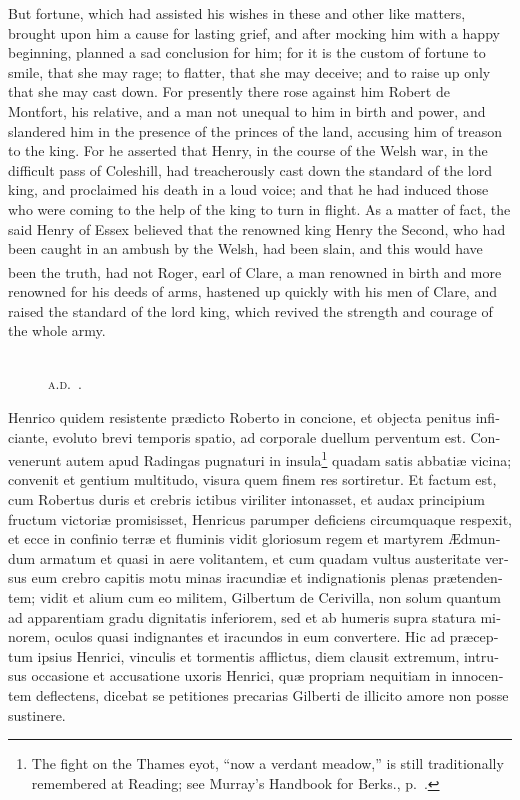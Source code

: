 \documentclass[10pt]{book}
\newcounter{engnote}
\newcommand{\engnotenum}{\textsuperscript{\arabic{engnote}\stepcounter{engnote}}}
\newcommand{\blockhead}[4][]{
\begin{figure}
\centering
\vspace{#4}
\parbox{2.75cm}{\begin{center}\footnotesize \color{BrickRed} \emph{#2}\\ #1 \end{center}}
\end{figure}
}
\begin{document}
\begin{paracol}{2}
\begin{otherlanguage}{latin}
\end{otherlanguage}

\switchcolumn

But fortune, which had assisted his wishes in these and other like matters, brought upon him a cause for lasting grief, and after mocking him with a happy beginning, planned a sad conclusion for him; for it is the custom of fortune to smile, that she may rage; to flatter, that she may deceive; and to raise up only that she may cast down. For presently there rose against him Robert de Montfort, his relative, and a man not unequal to him in birth and power, and slandered him in the presence of the princes of the land, accusing him of treason to the king. For he asserted that Henry, in the course of the Welsh war, in the difficult pass of Coleshill, had treacherously cast down the standard of the lord king, and proclaimed his death in a loud voice; and that he had induced those who were coming to the help of the king to turn in flight. As a matter of fact, the said Henry of Essex believed that the renowned king Henry the Second, who had been caught in an ambush by the Welsh, had been slain, and this would have been the truth, had not Roger, earl of Clare,\engnotenum{} a man renowned in birth and more renowned for his deeds of arms, hastened up quickly with his men of Clare, and raised the standard of the lord king, which revived the strength and courage of the whole army.

\switchcolumn*

\begin{otherlanguage}{latin}
\blockhead[\textsc{a.d}.\ .]{}{2}{-0.35cm}
Henrico quidem resistente pr\ae{}dicto Roberto in concione, et objecta penitus inficiante, evoluto brevi temporis spatio, ad corporale duellum perventum est. Convenerunt autem apud Radingas pugnaturi in insula\footnote[\textdagger]{The fight on the Thames eyot, ``now a verdant meadow,'' is still traditionally remembered at Reading; see Murray's Handbook for Berks., p.\ .} quadam satis abbati\ae{} vicina; convenit et gentium multitudo, visura quem finem res sortiretur. Et factum est, cum Robertus duris et crebris ictibus viriliter intonasset, et audax principium fructum victori\ae{} promisisset, Henricus parumper deficiens circumquaque respexit, et ecce in confinio terr\ae{} et fluminis vidit gloriosum regem et martyrem \AE{}dmundum armatum et quasi in aere volitantem, et cum quadam vultus austeritate versus eum crebro capitis motu minas iracundi\ae{} et indignationis plenas pr\ae{}tendentem; vidit et alium cum eo militem, Gilbertum de Cerivilla, non solum quantum ad apparentiam gradu dignitatis inferiorem, sed et ab humeris supra statura minorem, oculos quasi indignantes et iracundos in eum convertere. Hic ad pr\ae{}ceptum ipsius Henrici, vinculis et tormentis afflictus, diem clausit extremum, intrusus occasione et accusatione uxoris Henrici, qu\ae{} propriam nequitiam in innocentem deflectens, dicebat se petitiones precarias Gilberti de illicito amore non posse sustinere. 


\end{otherlanguage}
\end{paracol}
\end{document}
